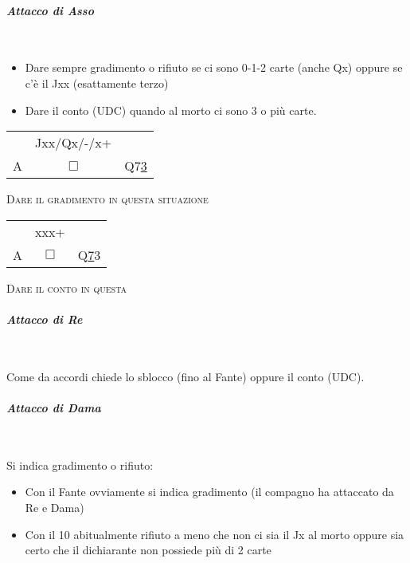 \documentclass[a4paper,italian]{article}
\newcommand{\cards}[1]{\textsf{#1}}
\newcommand\onesuitenw[3]%
{%
    \begin{center}%
        \begin{tabular}{>{\hfill}p{3cm}cp{3cm}}%
                & \cards{#2} \\%
            \cards{#1}& $\Box$    & \cards{#3}%
        \end{tabular}%
    \end{center}%
}
\begin{document}
\paragraph{\textit{Attacco di Asso}}\mbox{}\\
\vspace{-.4cm}
\begin{itemize}
    \item Dare sempre gradimento o rifiuto se ci sono 0-1-2 carte (anche Qx) oppure se c’è il Jxx
        (esattamente terzo)
    \item Dare il conto (UDC) quando al morto ci sono 3 o più carte.
\end{itemize}
\smallbreak

    \onesuitenw{A}{Jxx/Qx/-/x+}{Q7\underline{3}}
    \vspace{5pt}

    \begin{center}
        \textsc{Dare il gradimento in questa situazione}
    \end{center}

    \vspace{10pt}

    \onesuitenw{A}{xxx+}{Q\underline{7}3}
    \vspace{5pt}

    \begin{center}
        \textsc{Dare il conto in questa}
    \end{center}

\paragraph{\textit{Attacco di Re}}\mbox{}\\
\vspace{-.4cm}

Come da accordi chiede lo sblocco (fino al Fante) oppure il conto (UDC).

\paragraph{\textit{Attacco di Dama}}\mbox{}\\
\vspace{-.4cm}

Si indica gradimento o rifiuto:
\begin{itemize}
    \item Con il Fante ovviamente si indica gradimento (il compagno ha
        attaccato da Re e Dama)
    \item Con il 10 abitualmente rifiuto a meno che non ci sia il Jx al morto oppure sia certo che il dichiarante non possiede più di 2 carte
\end{itemize}
\newpage
\setlength{\columnseprule}{1pt}
\def\columnseprulecolor{\color{black}}
\end{document}
